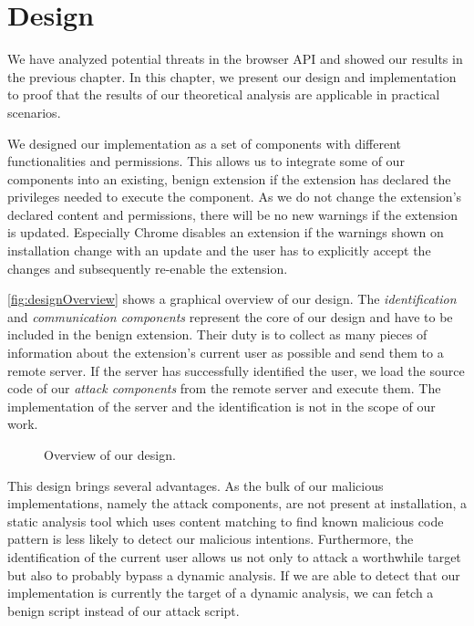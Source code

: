 
\chapter{Design}
\label{chp:design}

	We have analyzed potential threats in the browser API and showed our results in the previous chapter. In this chapter, we present our design and implementation to proof that the results of our theoretical analysis are applicable in practical scenarios. 
	
	We designed our implementation as a set of components with different functionalities and permissions. This allows us to integrate some of our components into an existing, benign extension if the extension has declared the privileges needed to execute the component. As we do not change the extension's declared content and permissions, there will be no new warnings if the extension is updated. Especially Chrome disables an extension if the warnings shown on installation change with an update and the user has to explicitly accept the changes and subsequently re-enable the extension. 
	
	\autoref{fig:designOverview} shows a graphical overview of our design. The \textit{identification} and \textit{communication components} represent the core of our design and have to be included in the benign extension. Their duty is to collect as many pieces of information about the extension's current user as possible and send them to a remote server. If the server has successfully identified the user, we load the source code of our \textit{attack components} from the remote server and execute them. The implementation of the server and the identification is not in the scope of our work. 
	
	\begin{figure}[h]
		\centering
		\def\svgscale{0.8}
		
		\caption{Overview of our design.}
		\label{fig:designOverview}
	\end{figure}
	
	This design brings several advantages. As the bulk of our malicious implementations, namely the attack components, are not present at installation, a static analysis tool which uses content matching to find known malicious code pattern is less likely to detect our malicious intentions. Furthermore, the identification of the current user allows us not only to attack a worthwhile target but also to probably bypass a dynamic analysis. If we are able to detect that our implementation is currently the target of a dynamic analysis, we can fetch a benign script instead of our attack script. 

